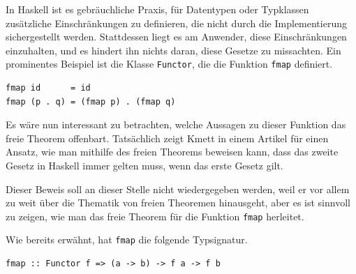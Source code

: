 
In Haskell ist es gebräuchliche Praxis, für Datentypen oder Typklassen zusätzliche Einschränkungen zu definieren, die nicht durch
die Implementierung sichergestellt werden. Stattdessen liegt es am Anwender, diese Einschränkungen einzuhalten, und es hindert
ihn nichts daran, diese Gesetze zu missachten. Ein prominentes Beispiel ist die Klasse \texttt{Functor}, die die Funktion
\texttt{fmap} definiert.



\begin{verbatim}
fmap id      = id
fmap (p . q) = (fmap p) . (fmap q)
\end{verbatim}


Es wäre nun interessant zu betrachten, welche Aussagen zu dieser Funktion das freie Theorem offenbart. Tatsächlich zeigt
Kmett in einem Artikel für \cite{schoolofhaskell.com} \cite{fmap} einen Ansatz, wie man mithilfe des freien Theorems beweisen
kann, dass das zweite Gesetz in Haskell immer gelten muss, wenn das erste Gesetz gilt. 

Dieser Beweis soll an dieser Stelle nicht wiedergegeben werden, weil er vor allem zu weit über die Thematik von freien Theoremen
hinausgeht, aber es ist sinnvoll zu zeigen, wie man das freie Theorem für die Funktion \texttt{fmap} herleitet.

Wie bereits erwähnt, hat \texttt{fmap} die folgende Typsignatur.

\begin{verbatim}
fmap :: Functor f => (a -> b) -> f a -> f b
\end{verbatim}

